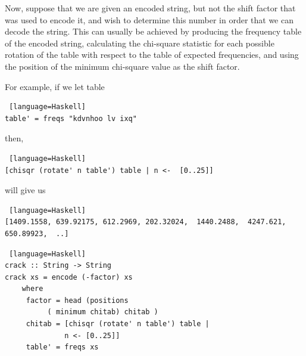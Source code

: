 \documentclass{beamer}
\def\frametitle#1{}
\begin{document}
\begin{frame} [fragile]
   \frametitle{Frequency Tables cont. } 
Now, suppose that we are given an encoded string, but not the shift factor that was used to encode it, 
and wish to determine this number in order that we can decode the string. 
This can usually be achieved by producing the frequency table of the encoded string, 
calculating the chi-square statistic for each possible rotation of the table with respect to the 
table of expected frequencies, and using the position of the minimum chi-square value as the shift factor. 
\end{frame}
 
\begin{frame} [fragile]
   \frametitle{Frequency Tables cont. } 
For example, if we let table 

\begin{onlyenv}
\begin{lstlisting} [language=Haskell]
table' = freqs "kdvnhoo lv ixq"
\end{lstlisting}
 \end{onlyenv}    

then, 
 
   \begin{onlyenv}
  \begin{lstlisting} [language=Haskell]
[chisqr (rotate' n table') table | n <-  [0..25]]
  \end{lstlisting}
\end{onlyenv}    
   will give us
   \begin{onlyenv}
    \begin{lstlisting} [language=Haskell]
[1409.1558, 639.92175, 612.2969, 202.32024,  1440.2488,  4247.621, 650.89923,  ..]
\end{lstlisting}
 \end{onlyenv}    
 \end{frame}
 \begin{frame} [fragile]
    \frametitle{Cracking the Code}

  \begin{onlyenv}
  \begin{lstlisting} [language=Haskell]
crack :: String -> String 
crack xs = encode (-factor) xs
    where
     factor = head (positions  
     	  ( minimum chitab) chitab ) 
     chitab = [chisqr (rotate' n table') table | 
     	      n <- [0..25]]
     table' = freqs xs
\end{lstlisting}
 \end{onlyenv}    
\end{frame}
\end{document}
